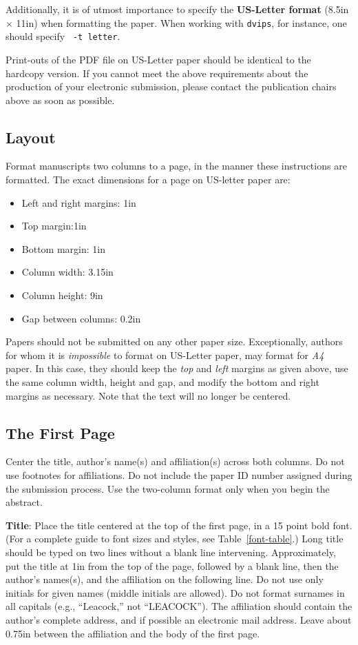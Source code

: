 \documentclass[11pt,letterpaper]{article}
\begin{document}
Additionally, it is of utmost importance to specify the {\bf
  US-Letter format} (8.5in $\times$ 11in) when formatting the paper.
When working with {\tt dvips}, for instance, one should specify {\tt
  -t letter}.

Print-outs of the PDF file on US-Letter paper should be identical to the
hardcopy version.  If you cannot meet the above requirements about the
production of your electronic submission, please contact the
publication chairs above  as soon as possible.


\subsection{Layout}
\label{ssec:layout}

Format manuscripts two columns to a page, in the manner these
instructions are formatted. The exact dimensions for a page on US-letter
paper are:

\begin{itemize}
\item Left and right margins: 1in
\item Top margin:1in
\item Bottom margin: 1in
\item Column width: 3.15in
\item Column height: 9in
\item Gap between columns: 0.2in
\end{itemize}

\noindent Papers should not be submitted on any other paper size. Exceptionally,
authors for whom it is \emph{impossible} to format on US-Letter paper,
may format for \emph{A4} paper. In this case, they should keep the \emph{top}
and \emph{left} margins as given above, use the same column width,
height and gap, and modify the bottom and right margins as necessary.
Note that the text will no longer be centered.

\subsection{The First Page}
\label{ssec:first}

Center the title, author's name(s) and affiliation(s) across both
columns. Do not use footnotes for affiliations.  Do not include the
paper ID number assigned during the submission process. 
Use the two-column format only when you begin the abstract.

{\bf Title}: Place the title centered at the top of the first page, in
a 15 point bold font.  (For a complete guide to font sizes and styles, see Table~\ref{font-table}.)
Long title should be typed on two lines without
a blank line intervening. Approximately, put the title at 1in from the
top of the page, followed by a blank line, then the author's names(s),
and the affiliation on the following line.  Do not use only initials
for given names (middle initials are allowed). Do not format surnames
in all capitals (e.g., ``Leacock,'' not ``LEACOCK'').  The affiliation should
contain the author's complete address, and if possible an electronic
mail address. Leave about 0.75in between the affiliation and the body
of the first page.
\end{document}
